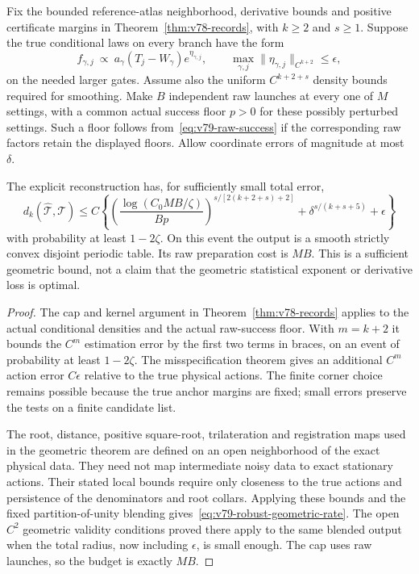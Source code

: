 \begin{theorem}
\label{thm:v79-robust-geometry}
Fix the bounded reference-atlas neighborhood, derivative bounds and
positive certificate margins in Theorem~\ref{thm:v78-records}, with
$k\ge2$ and $s\ge1$.  Suppose the true conditional laws on every
branch have the form
\[
 f_{\gamma,j}\ \propto\
     a_\gamma(T_j-W_\gamma)e^{\eta_{\gamma,j}},
 \qquad
 \max_{\gamma,j}\|\eta_{\gamma,j}\|_{C^{k+2}}\le\epsilon,
\]
on the needed larger gates.  Assume also the uniform
$C^{k+2+s}$ density bounds required for smoothing.  Make $B$ independent
raw launches at every one of $M$ settings, with a common actual success
floor $p>0$ for these possibly perturbed settings.  Such a floor follows
from~\eqref{eq:v79-raw-success} if the corresponding raw factors retain
the displayed floors.  Allow coordinate errors of magnitude at most
$\delta$.

The explicit reconstruction has, for sufficiently small total error,
\begin{equation}\label{eq:v79-robust-geometric-rate}
 d_k(\widehat{\mathcal T},\mathcal T)
 \le C\left\{
  \left(\frac{\log(C_0MB/\zeta)}{Bp}\right)^{s/[2(k+2+s)+2]}
       +\delta^{s/(k+s+5)}+\epsilon\right\}
\end{equation}
with probability at least $1-2\zeta$.  On this event the output is a
smooth strictly convex disjoint periodic table.  Its raw preparation
cost is $MB$.  This is a sufficient geometric bound, not a claim that
the geometric statistical exponent or derivative loss is optimal.
\end{theorem}
\begin{proof}
The cap and kernel argument in Theorem~\ref{thm:v78-records} applies
to the actual conditional densities and the actual raw-success floor.
With $m=k+2$ it bounds the $C^m$ estimation error by the first two terms
in braces, on an event of probability at least $1-2\zeta$.
The misspecification theorem gives an additional $C^m$ action error
$C\epsilon$ relative to the true physical actions.  The finite corner
choice remains possible because the true anchor margins are fixed;
small errors preserve the tests on a finite candidate list.

The root, distance, positive square-root, trilateration and registration
maps used in the geometric theorem are defined on an open neighborhood
of the exact physical data.  They need not map intermediate noisy data
to exact stationary actions.  Their stated local bounds require only
closeness to the true actions and persistence of the denominators and
root collars.  Applying these bounds and the fixed partition-of-unity
blending gives~\eqref{eq:v79-robust-geometric-rate}.  The open
$C^2$ geometric validity conditions proved there apply to the same
blended output when the total radius, now including $\epsilon$, is
small enough.  The cap uses raw launches, so the budget is exactly $MB$.
\end{proof}

